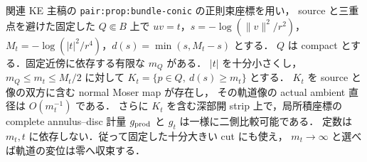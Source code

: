 \begin{theorem}
\label{ke:fixed-base-neck-moser}
関連 KE 主稿の \texttt{pair:prop:bundle-conic} の正則束座標を用い，
source と三重点を避けた固定した $Q\Subset B$ 上で
$uv=t$，$s=-\log(\|v\|^2/r^2)$，
$M_t=-\log(|t|^2/r^4)$，$d(s)=\min(s,M_t-s)$ とする．
$Q$ は compact とする．固定近傍に依存する有限な $m_Q$ がある．
$|t|$ を十分小さくし，$m_Q\le m_t\le M_t/2$ に対して
$K_t=\{p\in Q,\ d(s)\ge m_t\}$ とする．
$K_t$ を source と像の双方に含む normal Moser map が存在し，
その軌道像の actual ambient 直径は $O(m_t^{-1})$ である．
さらに $K_t$ を含む深部開 strip 上で，局所積座標の complete
annulus--disc 計量 $g_{\rm prod}$ と $g_t$ は一様に二側比較可能である．
定数は $m_t,t$ に依存しない．従って固定した十分大きい cut にも使え，
$m_t\to\infty$ と選べば軌道の変位は零へ収束する．
\end{theorem}

